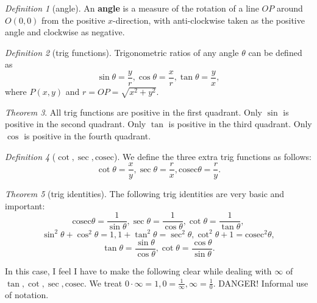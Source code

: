 \documentclass[8pt]{article}
\theoremstyle{remark}
\newtheorem{theorem}{Theorem}[section]
\newtheorem{definition}[theorem]{Definition}
\begin{document}
        \begin{definition}[angle]
            An \textbf{angle} is a measure of the rotation of a line $OP$ around $O(0, 0)$ from the positive $x$-direction, with anti-clockwise taken as the positive angle and clockwise as negative.
        \end{definition}

        \begin{definition}[trig functions]
            Trigonometric ratios of any angle $\theta$ can be defined as
            $$
                \sin \theta = \frac{y}{r}, \cos \theta = \frac{x}{r}, \tan \theta = \frac{y}{x},
            $$
            where $P(x, y)$ and $r = OP = \sqrt{x^2 + y^2}$.
        \end{definition}

        \begin{theorem}
            All trig functions are positive in the first quadrant. Only $\sin$ is positive in the second quadrant. Only $\tan$ is positive in the third quadrant. Only $\cos$ is positive in the fourth quadrant.
        \end{theorem}

        \newcommand{\cosec}{\mathrm{cosec}}

        \begin{definition}[$\cot, \sec, \cosec$]
            We define the three extra trig functions as follows:
            $$
                \cot \theta = \frac{x}{y}, \sec \theta = \frac{r}{x}, \cosec \theta = \frac{r}{y}.
            $$
        \end{definition}

        \begin{theorem}[trig identities]
            The following trig identities are very basic and important:
            $$
                \cosec \theta = \frac{1}{\sin \theta}, \sec \theta = \frac{1}{\cos \theta}, \cot \theta = \frac{1}{\tan \theta},
            $$
            $$
                \sin^2 \theta + \cos^2 \theta = 1, 1 + \tan^2 \theta = \sec^2 \theta, \cot^2 \theta + 1 = \cosec^2 \theta,
            $$
            $$
                \tan \theta = \frac{\sin \theta}{\cos \theta}, \cot \theta = \frac{\cos \theta}{\sin \theta}.
            $$

            In this case, I feel I have to make the following clear while dealing with $\infty$ of $\tan, \cot, \sec, \cosec$. We treat $0 \cdot \infty = 1, 0 = \frac{1}{\infty}, \infty = \frac{1}{0}$. DANGER! Informal use of notation.
        \end{theorem}
\end{document}

